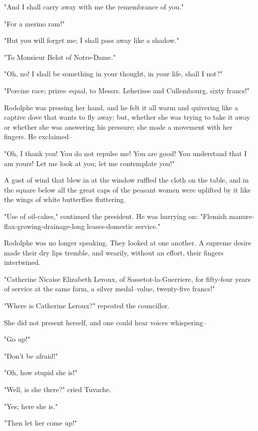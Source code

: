\documentclass[11pt,twocolumn]{ltugboat}
\begin{document}
"And I shall carry away with me the remembrance of you."

"For a merino ram!"

"But you will forget me; I shall pass away like a shadow."

"To Monsieur Belot of Notre-Dame."

"Oh, no! I shall be something in your thought, in your life, shall I
not?"

"Porcine race; prizes--equal, to Messrs. Leherisse and Cullembourg,
sixty francs!"

Rodolphe was pressing her hand, and he felt it all warm and quivering
like a captive dove that wants to fly away; but, whether she was trying
to take it away or whether she was answering his pressure; she made a
movement with her fingers. He exclaimed--

"Oh, I thank you! You do not repulse me! You are good! You understand
that I am yours! Let me look at you; let me contemplate you!"

A gust of wind that blew in at the window ruffled the cloth on the
table, and in the square below all the great caps of the peasant women
were uplifted by it like the wings of white butterflies fluttering.

"Use of oil-cakes," continued the president. He was hurrying on:
"Flemish manure-flax-growing-drainage-long leases-domestic service."

Rodolphe was no longer speaking. They looked at one another. A supreme
desire made their dry lips tremble, and wearily, without an effort,
their fingers intertwined.

"Catherine Nicaise Elizabeth Leroux, of Sassetot-la-Guerriere, for
fifty-four years of service at the same farm, a silver medal--value,
twenty-five francs!"

"Where is Catherine Leroux?" repeated the councillor.

She did not present herself, and one could hear voices whispering--

"Go up!"

"Don't be afraid!"

"Oh, how stupid she is!"

"Well, is she there?" cried Tuvache.

"Yes; here she is."

"Then let her come up!"
\end{document}
